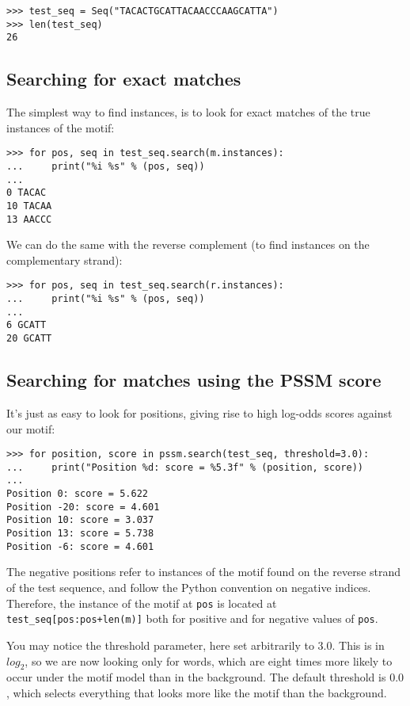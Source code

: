 \begin{verbatim}
>>> test_seq = Seq("TACACTGCATTACAACCCAAGCATTA")
>>> len(test_seq)
26
\end{verbatim}

\subsection{Searching for exact matches}

The simplest way to find instances, is to look for exact matches of
the true instances of the motif:

\begin{verbatim}
>>> for pos, seq in test_seq.search(m.instances):
...     print("%i %s" % (pos, seq))
...
0 TACAC
10 TACAA
13 AACCC
\end{verbatim}
We can do the same with the reverse complement (to find instances on the complementary strand):

\begin{verbatim}
>>> for pos, seq in test_seq.search(r.instances):
...     print("%i %s" % (pos, seq))
...
6 GCATT
20 GCATT
\end{verbatim}

\subsection{Searching for matches using the PSSM score}

It's just as easy to look for positions, giving rise to high log-odds scores against our motif:

\begin{verbatim}
>>> for position, score in pssm.search(test_seq, threshold=3.0):
...     print("Position %d: score = %5.3f" % (position, score))
...
Position 0: score = 5.622
Position -20: score = 4.601
Position 10: score = 3.037
Position 13: score = 5.738
Position -6: score = 4.601
\end{verbatim}
The negative positions refer to instances of the motif found on the
reverse strand of the test sequence, and follow the Python convention
on negative indices. Therefore, the instance of the motif at \verb|pos|
is located at \verb|test_seq[pos:pos+len(m)]| both for positive and for
negative values of \verb|pos|.

You may notice the threshold parameter, here set arbitrarily to
$3.0$. This is in $log_2$, so we are now looking only for words, which
are eight times more likely to occur under the motif model than in the
background. The default threshold is $0.0$, which selects everything
that looks more like the motif than the background.

